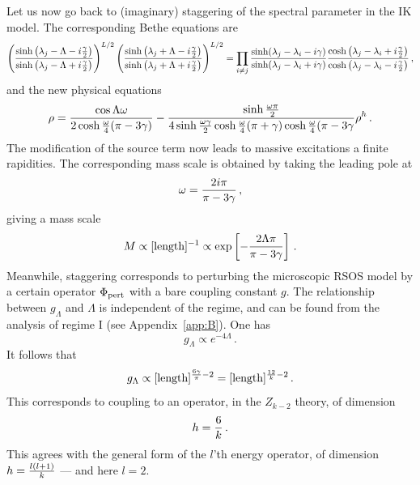 \documentclass[11pt]{article}
\begin{document}
Let us now go back to (imaginary) staggering of the spectral parameter in the IK model. The corresponding Bethe equations are 
%
\begin{equation}
\left( {\sinh\left(\lambda_j-\Lambda-i{\gamma\over 2}\right)\over  
\sinh\left(\lambda_j-\Lambda+i{\gamma\over 2}\right)} \right)^{L/2}
\left( {\sinh\left(\lambda_j+\Lambda-i{\gamma\over 2}\right)\over  
\sinh\left(\lambda_j+\Lambda+i{\gamma\over 2}\right)} \right)^{L/2}
=
\prod_{i\neq j} {\sinh(\lambda_j-\lambda_i-i\gamma)\over  \sinh
(\lambda_j-\lambda_i+i\gamma)}{\cosh\left(\lambda_j-\lambda_i+i{\gamma\over 2}\right)\over  
\cosh\left(\lambda_j-\lambda_i-i{\gamma\over 2}\right)} \,,
\label{basicstageqs}
\end{equation}
%
and the new  physical equations
%
\begin{equation}
\rho={\cos\Lambda\omega\over 2\cosh {\omega\over 4}(\pi-3\gamma)}-{\sinh {\omega\pi\over 2}\over 
4\sinh {\omega\gamma\over 2}\cosh {\omega\over 4}(\pi+\gamma)\cosh {\omega\over 4}(\pi-3\gamma}\rho^h \,.
\end{equation}
%
The modification of the source term now leads to massive excitations a finite rapidities. The corresponding mass scale is obtained by taking the leading pole at 
%
\begin{equation}
\omega={2i\pi\over \pi-3\gamma} \,,
\end{equation}
%
giving a mass scale 
%
\begin{equation}
M\propto [\hbox{length}]^{-1}\propto \exp\left[-{2\Lambda\pi\over \pi-3\gamma}\right] \,.
\end{equation}
%
Meanwhile,  staggering corresponds to perturbing the microscopic RSOS model by a certain operator $\Phi_{\rm pert}$ with a bare coupling constant $g$. The relationship between $g_\Lambda$ and $\Lambda$ is independent of the regime, and can be found from the analysis of regime I (see Appendix~\ref{app:B}). One has 
%
\begin{equation}
g_\Lambda\propto e^{-4\Lambda} \,.
\end{equation}
%
It follows that 
%
\begin{equation}
g_\Lambda\propto [\hbox{length}]^{{6\gamma\over\pi}-2}=[\hbox{length}]^{{12\over k}-2} \,.
\end{equation}
%
This corresponds to coupling to an operator, in the $Z_{k-2}$ theory, of dimension
%
\begin{equation}
h={6\over k} \,.
\end{equation}
%
This agrees with the general form of the $l$'th energy operator, of dimension $h={l(l+1)\over k}$ --- and here $l=2$. 
\end{document}
